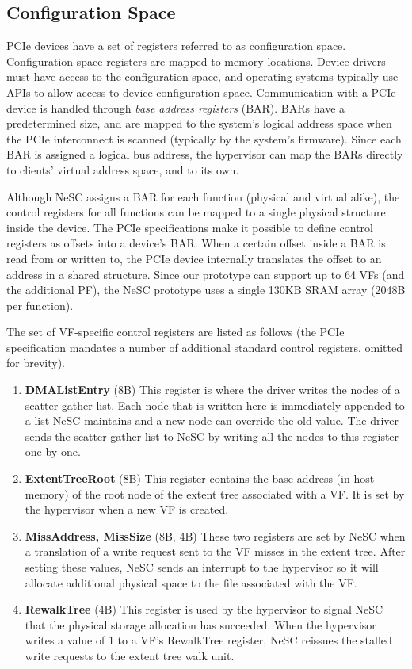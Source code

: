\subsection*{Configuration Space}
PCIe devices have a set of registers referred to as configuration space. Configuration space registers are mapped to memory locations. Device drivers must have access to the configuration space, and operating systems typically use APIs to allow access to device configuration space.
Communication with a PCIe device is handled through \emph{base address registers} (BAR). BARs have a predetermined size, and are mapped to the system's logical address space when the PCIe interconnect is scanned (typically by the system's firmware). Since each BAR is assigned a logical bus address, the hypervisor can map the BARs directly to clients' virtual address space, and to its own.

Although NeSC assigns a BAR for each function (physical and virtual alike), the control registers for all functions can be mapped to a single physical structure inside the device.
The PCIe specifications make it possible to define control registers as offsets into a device's BAR. When a certain offset inside a BAR is read from or written to, the PCIe device internally translates the offset to an address in a shared structure.
Since our prototype can support up to 64 VFs (and the additional PF), the NeSC prototype uses a single 130KB SRAM array (2048B per function).

The set of VF-specific control registers are listed as follows (the PCIe specification mandates a number of additional standard control registers, omitted for brevity).
\begin{enumerate}
\item
  \textbf{DMAListEntry} (8B) \quad
  This register is where the driver writes the nodes of a scatter-gather list. Each node that is written here
  is immediately appended to a list NeSC maintains and a new node can override the old value. The driver sends the scatter-gather list to NeSC by writing all the nodes to this register one by one.

\item
  \textbf{ExtentTreeRoot} (8B)\quad
  This register contains the base address (in host memory) of the root node of the extent tree associated with a VF. It is set by the hypervisor when a new VF is created. 
%
\item
  \textbf{MissAddress, MissSize} (8B, 4B)\quad
  These two registers are set by NeSC when a translation of a write request sent to the VF misses in the extent tree. After setting these values, NeSC sends an interrupt to the hypervisor so it will allocate additional physical space to the file associated with the VF.
%
\item
  \textbf{RewalkTree} (4B)\quad
  This register is used by the hypervisor to signal NeSC that the physical storage allocation has succeeded. When the hypervisor writes a value of 1 to a VF's RewalkTree register, NeSC reissues the stalled write requests to the extent tree walk unit.
\end{enumerate}

